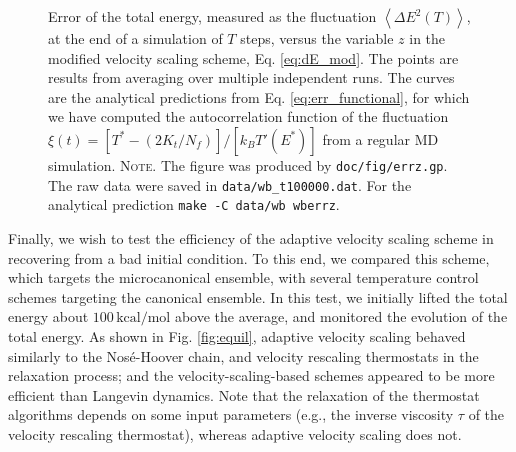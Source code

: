 \documentclass[reprint]{revtex4-1}
\newcommand{\note}[1]{{\color{DarkGreen}\footnotesize \textsc{Note.} #1}}
\begin{document}
\begin{figure}[h]
\begin{center}
  \caption{
    \label{fig:errz}
    Error of the total energy,
    measured as the fluctuation
    $\left\langle \Delta E^2(T) \right\rangle$,
    at the end of a simulation of $T$ steps,
    versus the variable $z$
    in the modified velocity scaling scheme,
    Eq. \eqref{eq:dE_mod}.
    The points are results from averaging over
    multiple independent runs.
    The curves are the analytical predictions from
    Eq. \eqref{eq:err_functional},
    for which we have computed the autocorrelation function
    of the fluctuation
    $\xi(t) = \left[T^* - \left( 2 K_t / N_f \right)\right]/\left[ k_B T'(E^*) \right]$
    from a regular MD simulation.
    \note{The figure was produced by \texttt{doc/fig/errz.gp}.
      The raw data were saved in \texttt{data/wb\_t100000.dat}.
      For the analytical prediction \texttt{make -C data/wb wberrz}.
    }%
  }
\end{center}
\end{figure}



Finally, we wish to test
the efficiency of the adaptive velocity scaling scheme
in recovering from a bad initial condition.
%
To this end,
we compared this scheme,
which targets the microcanonical ensemble,
with several temperature control schemes
targeting the canonical ensemble.
%
In this test, we initially lifted the total energy about
$100\,\mathrm{kcal/mol}$ above the average,
and monitored the evolution of the total energy.
%
As shown in Fig. \ref{fig:equil},
adaptive velocity scaling
behaved similarly to
the Nos\'e-Hoover chain\cite{nose1984, nose1984mp, hoover1985, martyna1992},
and velocity rescaling\cite{bussi2007}
thermostats
in the relaxation process;
and the velocity-scaling-based schemes
appeared to be more efficient than Langevin dynamics.
%
Note that the relaxation
of the thermostat algorithms
depends on some input parameters
(e.g., the inverse viscosity $\tau$ of the velocity rescaling thermostat),
whereas adaptive velocity scaling does not.
\end{document}
